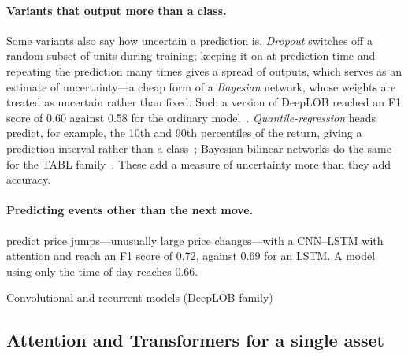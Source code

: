 \paragraph{Variants that output more than a class.} Some variants also say how uncertain a prediction is.
\emph{Dropout} switches off a random subset of units during training; keeping it on at prediction time and repeating
the prediction many times gives a spread of outputs, which serves as an estimate of uncertainty---a cheap form of a
\emph{Bayesian} network, whose weights are treated as uncertain rather than fixed. Such a version of DeepLOB reached an
F1 score of 0.60 against 0.58 for the ordinary model~\citep{zhang2018bdlob}. \emph{Quantile-regression} heads predict,
for example, the 10th and 90th percentiles of the return, giving a prediction interval rather than a
class~\citep{zhang2019qr}; Bayesian bilinear networks do the same for the TABL family~\citep{magris2023bbnn}. These add a
measure of uncertainty more than they add accuracy.

\paragraph{Predicting events other than the next move.} \citet{makinen2019jump} predict price jumps---unusually large
price changes---with a CNN--LSTM with attention and reach an F1 score of 0.72, against 0.69 for an LSTM. A model
using only the time of day reaches 0.66.

\begin{modelcard}{Convolutional and recurrent models (DeepLOB family)}
\end{modelcard}

\subsection{Attention and Transformers for a single asset}
\label{sec:deep-attn}

